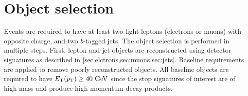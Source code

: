 \begin{table}[ht]
  \caption{Stop cross sections and their associated
    uncertainties~\cite{Beenakker:1997ut,Beenakker:2010nq,Beenakker:2011fu}.
  }
  \label{tab:stop_xsec}
\end{table}

\FloatBarrier
\section{Object selection}
\label{sec:object_selection}

Events are required to have at least two light leptons (electrons or muons)
with opposite charge, and two $b$-tagged jets.
The object selection is performed in multiple steps. First, lepton and jet
objects are reconstructed using detector signatures as described in
\cref{sec:elctrons,sec:muons,sec:jets}.
Baseline requirements are applied to remove poorly reconstructed objects.
All baseline objects are required to have $\ET(\pt) \geq 40 \GeV$ since the
stop signatures of interest are of high mass and produce high momentum decay
products.

